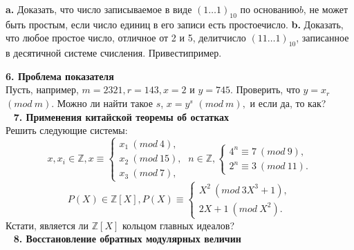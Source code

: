 \documentclass{mai_book}
\begin{document}
\textbf{a.} Доказать, что число записываемое в виде ${(1\ldots1)}_{10}$ по основанию\newline $b$, не может быть простым, если число единиц в его записи есть простое\newline число.\newline
\hspace*{15pt}\textbf{b.} Доказать, что любое простое число, отличное от 2 и 5, делит\newline число ${(11\ldots1)}_{10}$, записанное в десятичной системе счисления. Привести\newline пример.\newline\newpage

\restoretop
{}
\noindent\textbf{6. Проблема показателя}\\

Пусть, например, $m = 2 321, r = 143, x = 2$ и $y = 745$. Проверить, что $y = x_r$ $(mod\ m).$ Можно ли найти такое $s$, $x = y^s$ $(mod\ m),$ и если да, то как?\\
\ \newline
\noindent\textbf{7. Применения китайской теоремы об остатках}\\

Решить следующие системы:
    $$x,x_i\in\mathbb{Z}, x\equiv
    \begin{cases}
    x_1~(mod\ 4), \\
    x_2~(mod\ 15), \\
    x_3~(mod\ 7),
    \end{cases}
    \
    n\in\mathbb{Z},
    \begin{cases}
    4^n \equiv 7~(mod\ 9),\\
    2^n \equiv 3~(mod\ 11).
    \end{cases}
    $$
    $$
    P(X)\in\mathbb{Z}[X], P(X)\equiv
    \begin{cases}
    X^2~(mod\ 3X^3+1),\\
    2X+1~(mod\ X^2).
    \end{cases}
    $$
    Кстати, является ли $\mathbb{Z}[X]$ кольцом главных идеалов?\\
\ \newline
\noindent\textbf{8. Восстановление обратных модулярных величин}\\
\end{document}
